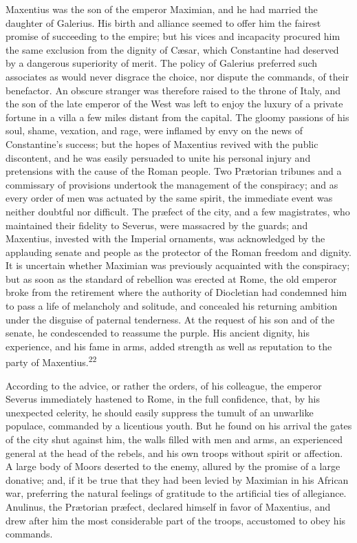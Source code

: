 Maxentius was the son of the emperor Maximian, and he had married
the daughter of Galerius. His birth and alliance seemed to offer
him the fairest promise of succeeding to the empire; but his
vices and incapacity procured him the same exclusion from the
dignity of Cæsar, which Constantine had deserved by a dangerous
superiority of merit. The policy of Galerius preferred such
associates as would never disgrace the choice, nor dispute the
commands, of their benefactor. An obscure stranger was therefore
raised to the throne of Italy, and the son of the late emperor of
the West was left to enjoy the luxury of a private fortune in a
villa a few miles distant from the capital. The gloomy passions
of his soul, shame, vexation, and rage, were inflamed by envy on
the news of Constantine’s success; but the hopes of Maxentius
revived with the public discontent, and he was easily persuaded
to unite his personal injury and pretensions with the cause of
the Roman people. Two Prætorian tribunes and a commissary of
provisions undertook the management of the conspiracy; and as
every order of men was actuated by the same spirit, the immediate
event was neither doubtful nor difficult. The præfect of the
city, and a few magistrates, who maintained their fidelity to
Severus, were massacred by the guards; and Maxentius, invested
with the Imperial ornaments, was acknowledged by the applauding
senate and people as the protector of the Roman freedom and
dignity. It is uncertain whether Maximian was previously
acquainted with the conspiracy; but as soon as the standard of
rebellion was erected at Rome, the old emperor broke from the
retirement where the authority of Diocletian had condemned him to
pass a life of melancholy and solitude, and concealed his
returning ambition under the disguise of paternal tenderness. At
the request of his son and of the senate, he condescended to
reassume the purple. His ancient dignity, his experience, and his
fame in arms, added strength as well as reputation to the party
of Maxentius.\textsuperscript{22}


According to the advice, or rather the orders, of his colleague,
the emperor Severus immediately hastened to Rome, in the full
confidence, that, by his unexpected celerity, he should easily
suppress the tumult of an unwarlike populace, commanded by a
licentious youth. But he found on his arrival the gates of the
city shut against him, the walls filled with men and arms, an
experienced general at the head of the rebels, and his own troops
without spirit or affection. A large body of Moors deserted to
the enemy, allured by the promise of a large donative; and, if it
be true that they had been levied by Maximian in his African war,
preferring the natural feelings of gratitude to the artificial
ties of allegiance. Anulinus, the Prætorian præfect, declared
himself in favor of Maxentius, and drew after him the most
considerable part of the troops, accustomed to obey his commands.

